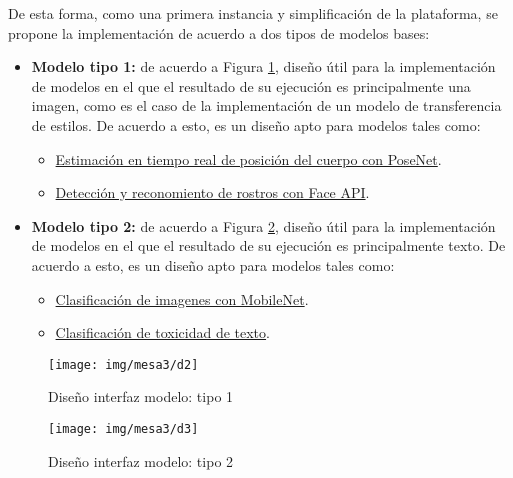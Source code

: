 \clearpage
De esta forma, como una primera instancia y simplificación de la plataforma, se propone la implementación de acuerdo a dos tipos de modelos bases:
\begin{itemize}
  \item \textbf{Modelo tipo 1:} de acuerdo a Figura \ref{fig:diseno2}, diseño útil para la implementación de modelos en el que el resultado de su ejecución es principalmente una imagen, como es el caso de la implementación de un modelo de transferencia de estilos. De acuerdo a esto, es un diseño apto para modelos tales como:
  \begin{itemize}
    \item \href{https://github.com/tensorflow/tfjs-models/tree/master/posenet}{Estimación en tiempo real de posición del cuerpo con PoseNet}.
    \item \href{https://github.com/justadudewhohacks/face-api.js}{Detección y reconomiento de rostros con Face API}. \\
  \end{itemize}


  \item \textbf{Modelo tipo 2:} de acuerdo a Figura \ref{fig:diseno3}, diseño útil para la implementación de modelos en el que el resultado de su ejecución es principalmente texto. De acuerdo a esto, es un diseño apto para modelos tales como:
  \begin{itemize}
    \item \href{https://github.com/tensorflow/tfjs-models/tree/master/mobilenet}{Clasificación de imagenes con MobileNet}.
    \item \href{https://github.com/tensorflow/tfjs-models/tree/master/toxicity}{Clasificación de toxicidad de texto}.\\
  \end{itemize}

\end{itemize}

\begin{figure}[H]
  \texttt{[image: img/mesa3/d2]}
  \centering
  \caption{Diseño interfaz modelo: tipo 1}
  \label{fig:diseno2}
\end{figure}

\begin{figure}[H]
  \texttt{[image: img/mesa3/d3]}
  \centering
  \caption{Diseño interfaz modelo: tipo 2}
  \label{fig:diseno3}
\end{figure}

